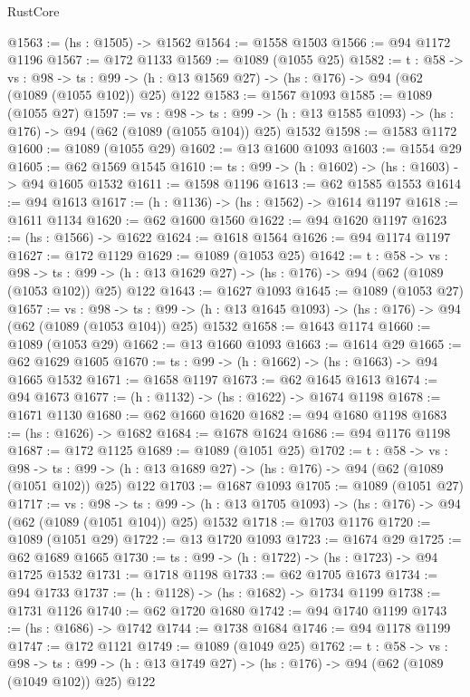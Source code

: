 \begin{lexlean}{RustCore}
\begin{coremodule}
@1563 := (hs : @1505) -> @1562
@1564 := @1558 @1503
@1566 := @94 @1172 @1196
@1567 := @172 @1133
@1569 := @1089 (@1055 @25)
@1582 := {t : @58} ->
  {vs : @98} ->
  {ts : @99} -> (h : @13 @1569 @27) -> (hs : @176) -> @94 (@62 (@1089 (@1055 @102)) @25) @122
@1583 := @1567 @1093
@1585 := @1089 (@1055 @27)
@1597 := {vs : @98} ->
  {ts : @99} -> (h : @13 @1585 @1093) -> (hs : @176) -> @94 (@62 (@1089 (@1055 @104)) @25) @1532
@1598 := @1583 @1172
@1600 := @1089 (@1055 @29)
@1602 := @13 @1600 @1093
@1603 := @1554 @29
@1605 := @62 @1569 @1545
@1610 := {ts : @99} -> (h : @1602) -> (hs : @1603) -> @94 @1605 @1532
@1611 := @1598 @1196
@1613 := @62 @1585 @1553
@1614 := @94 @1613
@1617 := (h : @1136) -> (hs : @1562) -> @1614 @1197
@1618 := @1611 @1134
@1620 := @62 @1600 @1560
@1622 := @94 @1620 @1197
@1623 := (hs : @1566) -> @1622
@1624 := @1618 @1564
@1626 := @94 @1174 @1197
@1627 := @172 @1129
@1629 := @1089 (@1053 @25)
@1642 := {t : @58} ->
  {vs : @98} ->
  {ts : @99} -> (h : @13 @1629 @27) -> (hs : @176) -> @94 (@62 (@1089 (@1053 @102)) @25) @122
@1643 := @1627 @1093
@1645 := @1089 (@1053 @27)
@1657 := {vs : @98} ->
  {ts : @99} -> (h : @13 @1645 @1093) -> (hs : @176) -> @94 (@62 (@1089 (@1053 @104)) @25) @1532
@1658 := @1643 @1174
@1660 := @1089 (@1053 @29)
@1662 := @13 @1660 @1093
@1663 := @1614 @29
@1665 := @62 @1629 @1605
@1670 := {ts : @99} -> (h : @1662) -> (hs : @1663) -> @94 @1665 @1532
@1671 := @1658 @1197
@1673 := @62 @1645 @1613
@1674 := @94 @1673
@1677 := (h : @1132) -> (hs : @1622) -> @1674 @1198
@1678 := @1671 @1130
@1680 := @62 @1660 @1620
@1682 := @94 @1680 @1198
@1683 := (hs : @1626) -> @1682
@1684 := @1678 @1624
@1686 := @94 @1176 @1198
@1687 := @172 @1125
@1689 := @1089 (@1051 @25)
@1702 := {t : @58} ->
  {vs : @98} ->
  {ts : @99} -> (h : @13 @1689 @27) -> (hs : @176) -> @94 (@62 (@1089 (@1051 @102)) @25) @122
@1703 := @1687 @1093
@1705 := @1089 (@1051 @27)
@1717 := {vs : @98} ->
  {ts : @99} -> (h : @13 @1705 @1093) -> (hs : @176) -> @94 (@62 (@1089 (@1051 @104)) @25) @1532
@1718 := @1703 @1176
@1720 := @1089 (@1051 @29)
@1722 := @13 @1720 @1093
@1723 := @1674 @29
@1725 := @62 @1689 @1665
@1730 := {ts : @99} -> (h : @1722) -> (hs : @1723) -> @94 @1725 @1532
@1731 := @1718 @1198
@1733 := @62 @1705 @1673
@1734 := @94 @1733
@1737 := (h : @1128) -> (hs : @1682) -> @1734 @1199
@1738 := @1731 @1126
@1740 := @62 @1720 @1680
@1742 := @94 @1740 @1199
@1743 := (hs : @1686) -> @1742
@1744 := @1738 @1684
@1746 := @94 @1178 @1199
@1747 := @172 @1121
@1749 := @1089 (@1049 @25)
@1762 := {t : @58} ->
  {vs : @98} ->
  {ts : @99} -> (h : @13 @1749 @27) -> (hs : @176) -> @94 (@62 (@1089 (@1049 @102)) @25) @122

\end{coremodule}
\end{lexlean}
